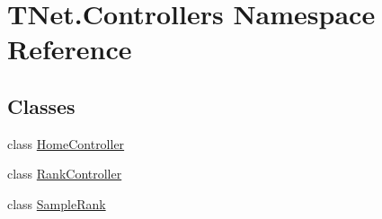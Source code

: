 \hypertarget{namespace_t_net_1_1_controllers}{}\section{T\+Net.\+Controllers Namespace Reference}
\label{namespace_t_net_1_1_controllers}
\subsection*{Classes}
\begin{DoxyCompactItemize}
\item 
class \mbox{\hyperlink{class_t_net_1_1_controllers_1_1_home_controller}{Home\+Controller}}
\item 
class \mbox{\hyperlink{class_t_net_1_1_controllers_1_1_rank_controller}{Rank\+Controller}}
\item 
class \mbox{\hyperlink{class_t_net_1_1_controllers_1_1_sample_rank}{Sample\+Rank}}
\end{DoxyCompactItemize}
